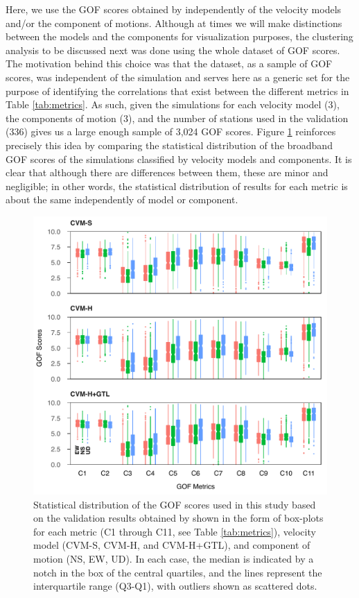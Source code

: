 Here, we use the GOF scores obtained by \citet{Taborda_2014_BSSA} independently of the velocity models and/or the component of motions. Although at times we will make distinctions between the models and the components for visualization purposes, the clustering analysis to be discussed next was done using the whole dataset of GOF scores. The motivation behind this choice was that the dataset, as a sample of GOF scores, was independent of the simulation and serves here as a generic set for the purpose of identifying the correlations that exist between the different metrics in Table \ref{tab:metrics}. As such, given the simulations for each velocity model (3), the components of motion (3), and the number of stations used in the validation (336) gives us a large enough sample of 3,024 GOF scores. Figure \ref{fig:data-box-plot} reinforces precisely this idea by comparing the statistical distribution of the broadband GOF scores of the simulations classified by velocity models and components. It is clear that although there are differences between them, these are minor and negligible; in other words, the statistical distribution of results for each metric is about the same independently of model or component.

\begin{figure}
    \centering
    \includegraphics[width=\columnwidth]{figures/pdf/figure-03}
    \caption{Statistical distribution of the GOF scores used in this study based on the validation results obtained by \citet{Taborda_2014_BSSA} shown in the form of box-plots for each metric (C1 through C11, see Table \ref{tab:metrics}), velocity model (CVM-S, CVM-H, and CVM-H+GTL), and component of motion (NS, EW, UD). In each case, the median is indicated by a notch in the box of the central quartiles, and the lines represent the interquartile range (Q3-Q1), with outliers shown as scattered dots.}
    \label{fig:data-box-plot}
\end{figure}

